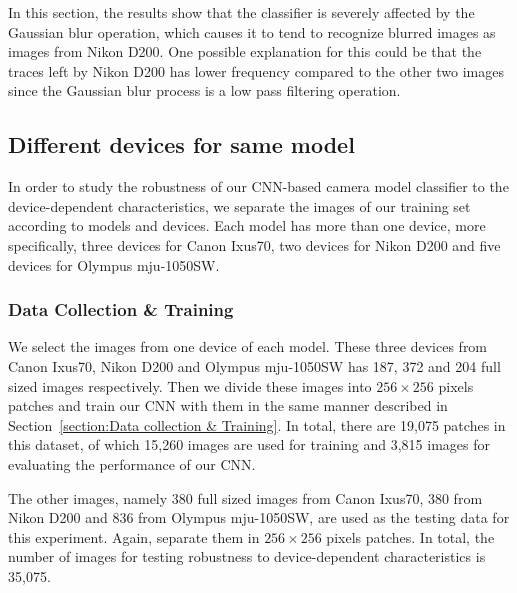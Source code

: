 \documentclass[a4paper, 9pt, twocolumn]{extarticle}
\begin{document}
In this section, the results show that the classifier is severely affected by the Gaussian blur operation, which causes it to tend to recognize blurred images as images from Nikon D200. One possible explanation for this could be that the traces left by Nikon D200 has lower frequency compared to the other two images since the Gaussian blur process is a low pass filtering operation.

\subsection{Different devices for same model}
\label{section:instance}

In order to study the robustness of our CNN-based camera model classifier to the device-dependent characteristics, we separate the images of our training set according to models and devices. Each model has more than one device, more specifically, three devices for Canon Ixus70, two devices for Nikon D200 and five devices for Olympus mju-1050SW. 

\subsubsection*{Data Collection \& Training}
\label{section:instance data collection}

We select the images from one device of each model. These three devices from Canon Ixus70, Nikon D200 and Olympus mju-1050SW has 187, 372 and 204 full sized images respectively. Then we divide these images into $ 256 \times 256 $ pixels patches and train our CNN with them in the same manner described in Section~\ref{section:Data collection & Training}. In total, there are 19,075 patches in this dataset, of which 15,260 images are used for training and 3,815 images for evaluating the performance of our CNN.

The other images, namely 380 full sized images from Canon Ixus70, 380 from Nikon D200 and 836 from Olympus mju-1050SW, are used as the testing data for this experiment. Again, separate them in $ 256 \times 256 $ pixels patches. In total, the number of images for testing robustness to device-dependent characteristics is 35,075.
\end{document}
